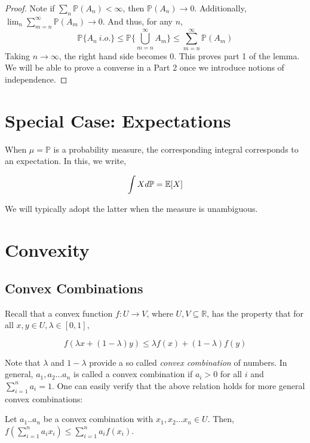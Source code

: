    \begin{proof}
        Note if $\sum_n \mathbb P(A_n) < \infty$, then $\mathbb P(A_n) \to 0$. Additionally, 
        $\lim_n \sum_{m=n}^\infty \mathbb P(A_m) \to 0$. And thus, for any $n$,
        \[ \mathbb P\{A_n \: i.o.\} \leq \mathbb P\{\bigcup_{m=n}^\infty A_m\} \leq \sum_{m = n}^\infty \mathbb P(A_m) \]
        Taking $n \to \infty$, the right hand side becomes $0$. This proves part 1 of the lemma. We will 
        be able to prove a converse in a Part 2 once we introduce notions of independence.
    \end{proof}

    \section{Special Case: Expectations}

    When $\mu = \mathbb P$ is a probability measure, the corresponding integral corresponds to an expectation. 
    In this, we write, 

    \[ \int X d\mathbb P = \mathbb E[X] \]

    We will typically adopt the latter when the measure is unambiguous. 

    \section{Convexity}

    \subsection{Convex Combinations}

    Recall that a convex function $f : U \to V$, where $U,V \subseteq \mathbb R$, has the property that for all 
    $x,y \in U, \lambda \in [0,1]$,

    \[ f(\lambda x + (1-\lambda) y) \leq \lambda f(x) + (1-\lambda) f(y) \]

    Note that $\lambda$ and $1-\lambda$ provide a so called \emph{convex combination} of numbers. 
    In general, $a_1, a_2...a_n$ is called a convex combination if $a_i > 0$ for all $i$ and 
    $\sum_{i=1}^n a_i = 1$. One can easily verify that the above relation holds for more 
    general convex combinations: 

    \begin{lemma}
        Let $a_1..a_n$ be a convex combination with $x_1,x_2...x_n \in U$. Then, 
        $f(\sum_{i=1}^n a_i x_i) \leq \sum_{i=1}^n a_i f(x_i)$.
    \end{lemma}
    
